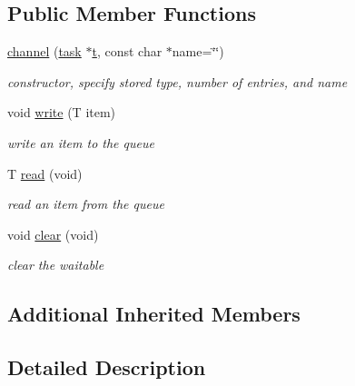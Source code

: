 \subsection*{Public Member Functions}
\begin{DoxyCompactItemize}
\item 
\hyperlink{class_r_t_o_s_1_1channel_a5580e7cd248a64985c8866c528cfebe6}{channel} (\hyperlink{class_r_t_o_s_1_1task}{task} $\ast$\hyperlink{class_r_t_o_s_1_1event_a1402687edb26c1d5d26e54dbda21919d}{t}, const char $\ast$name=\char`\"{}\char`\"{})
\begin{DoxyCompactList}\small\item\em constructor, specify stored type, number of entries, and name \end{DoxyCompactList}\item 
void \hyperlink{class_r_t_o_s_1_1channel_a09e4d10e0336283eb9ae402df0a25dbc}{write} (T item)\hypertarget{class_r_t_o_s_1_1channel_a09e4d10e0336283eb9ae402df0a25dbc}{}\label{class_r_t_o_s_1_1channel_a09e4d10e0336283eb9ae402df0a25dbc}

\begin{DoxyCompactList}\small\item\em write an item to the queue \end{DoxyCompactList}\item 
T \hyperlink{class_r_t_o_s_1_1channel_a66da852f3e9ef72066e5f582f4c2f218}{read} (void)\hypertarget{class_r_t_o_s_1_1channel_a66da852f3e9ef72066e5f582f4c2f218}{}\label{class_r_t_o_s_1_1channel_a66da852f3e9ef72066e5f582f4c2f218}

\begin{DoxyCompactList}\small\item\em read an item from the queue \end{DoxyCompactList}\item 
void \hyperlink{class_r_t_o_s_1_1channel_afd8cd81a91225ed144fc1ca20f3cd8f6}{clear} (void)
\begin{DoxyCompactList}\small\item\em clear the waitable \end{DoxyCompactList}\end{DoxyCompactItemize}
\subsection*{Additional Inherited Members}


\subsection{Detailed Description}
